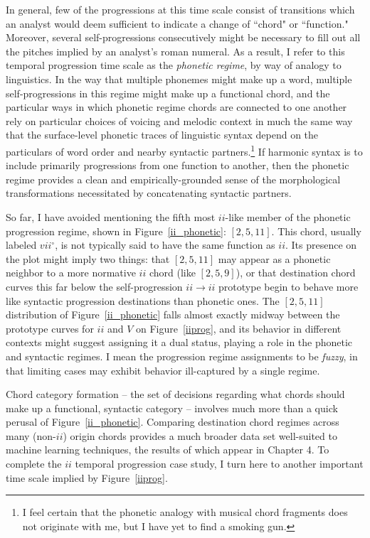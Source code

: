 In general, few of the progressions at this time scale consist of transitions which an analyst would deem sufficient to indicate a change of ``chord" or ``function."  Moreover, several self-progressions consecutively might be necessary to fill out all the pitches implied by an analyst's roman numeral.  As a result, I refer to this temporal progression time scale as the \emph{phonetic regime}, by way of analogy to linguistics.  In the way that multiple phonemes might make up a word, multiple self-progressions in this regime might make up a functional chord, and the particular ways in which phonetic regime chords are connected to one another rely on particular choices of voicing and melodic context in much the same way that the surface-level phonetic traces of linguistic syntax depend on the particulars of word order and nearby syntactic partners.\footnote{I feel certain that the phonetic analogy with musical chord fragments does not originate with me, but I have yet to find a smoking gun.}  If harmonic syntax is to include primarily progressions from one function to another, then the phonetic regime provides a clean and empirically-grounded sense of the morphological transformations necessitated by concatenating syntactic partners. 

So far, I have avoided mentioning the fifth most $ii$-like member of the phonetic progression regime, shown in Figure~\ref{ii_phonetic}: $[2,5,11]$.  This chord, usually labeled $vii^{\circ}$, is not typically said to have the same function as $ii$.  Its presence on the plot might imply two things: that $[2,5,11]$ may appear as a phonetic neighbor to a more normative $ii$ chord (like $[2,5,9]$), or that destination chord curves this far below the self-progression $ii \rightarrow ii$ prototype begin to behave more like syntactic progression destinations than phonetic ones.  The $[2,5,11]$ distribution of Figure~\ref{ii_phonetic} falls almost exactly midway between the prototype curves for $ii$ and $V$ on Figure~\ref{iiprog}, and its behavior in different contexts might suggest assigning it a dual status, playing a role in the phonetic and syntactic regimes.  I mean the progression regime assignments to be \emph{fuzzy}, in that limiting cases may exhibit behavior ill-captured by a single regime.

Chord category formation -- the set of decisions regarding what chords should make up a functional, syntactic category -- involves much more than a quick perusal of Figure~\ref{ii_phonetic}.  Comparing destination chord regimes across many (non-$ii$) origin chords provides a much broader data set well-suited to machine learning techniques, the results of which appear in Chapter 4.  To complete the $ii$ temporal progression case study, I turn here to another important time scale implied by Figure~\ref{iiprog}.

